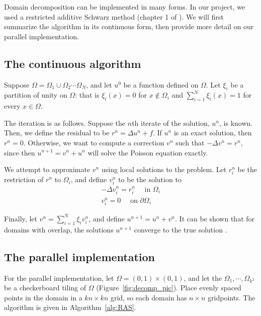 \documentclass{article}
\begin{document}
	Domain decomposition can be implemented in many forms.  In our project, we used a restricted additive Schwarz method (chapter 1 of \cite{Dolean15}).  We will first summarize the algorithm in its continuous form, then provide more detail on our parallel implementation.
	
	\subsection{The continuous algorithm}
	
	Suppose \(\Omega = \Omega_1 \cup \Omega_2 \cdots \Omega_N\), and let \(u^0\) be a function defined on \(\Omega\).  Let \(\xi_i\) be a partition of unity on \(\Omega\): that is \(\xi_i(x) = 0\) for \(x \not\in \Omega_i\) and \(\sum_{i=1}^N \xi_i(x) = 1\) for every \(x \in \Omega\).
	
	The iteration is as follows.  Suppose the \(n\)th iterate of the solution, \(u^n\), is known.  Then, we define the residual to be \(r^n = \Delta u^n + f\).  If \(u^n\) is an exact solution, then \(r^n = 0\).  Otherwise, we want to compute a correction \(v^n\) such that \(-\Delta v^n = r^n\), since then \(u^{n+1} = v^n + u^n\) will solve the Poisson equation exactly.  
	
	We attempt to approximate \(v^n\) using local solutions to the problem.  Let \(r^n_i\) be the restriction of \(r^n\) to \(\Omega_i\), and define \(v^n_i\) to be the solution to 
	\begin{equation}
		\begin{split}
			-\Delta v^n_i = r^n_i\quad \text{ in } \Omega_i\\
			v^n_i = 0 \quad \text{ on } \partial\Omega_i
		\end{split}
	\end{equation}
	
	Finally, let \(v^n = \sum_{i=1}^N\xi_iv^n_i\), and define \(u^{n+1} = u^n + v^n\).  It can be shown that for domains with overlap, the solutions \(u^{n+1}\) converge to the true solution \cite{Dolean15}.
	
	\subsection{The parallel implementation}
	
	For the parallel implementation, let \(\Omega = (0,1)\times(0,1)\), and let the \(\Omega_1, \cdots, \Omega_{k^2}\) be a checkerboard tiling of \(\Omega\) (Figure~\ref{fig:decomp_pic}).  Place evenly spaced points in the domain in a \(kn \times kn\) grid, so each domain has \(n \times n\) gridpoints.  The algorithm is given in Algorithm~\ref{alg:RAS}.  
	
\end{document}
